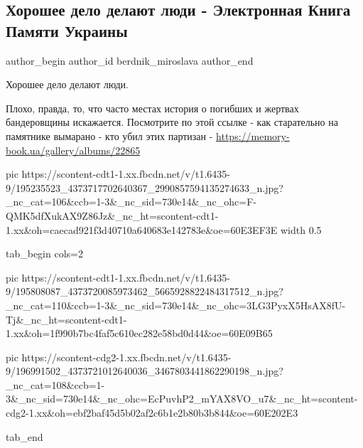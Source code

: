  
 
 
 
 
 
\subsection{Хорошее дело делают люди - Электронная Книга Памяти Украины}
\label{sec:06_06_2021.fb.berdnik_miroslava.3.kniga_pamjati_ukrainy}
\ifcmt
 author_begin
   author_id berdnik_miroslava
 author_end
\fi

Хорошее дело делают люди.

Плохо, правда, то, что часто местах история о погибших и жертвах бандеровщины
искажается.  Посмотрите по этой ссылке - как старательно на памятнике вымарано
- кто убил этих партизан - \url{https://memory-book.ua/gallery/albums/22865}

\ifcmt
  pic https://scontent-cdt1-1.xx.fbcdn.net/v/t1.6435-9/195235523_4373717702640367_2990857594135274633_n.jpg?_nc_cat=106&ccb=1-3&_nc_sid=730e14&_nc_ohc=F-QMK5dfXukAX9Z86Jz&_nc_ht=scontent-cdt1-1.xx&oh=caecad921f3d40710a640683e142783e&oe=60E3EF3E
	width 0.5

\fi

\ifcmt
  tab_begin cols=2

     pic https://scontent-cdt1-1.xx.fbcdn.net/v/t1.6435-9/195808087_4373720085973462_5665928822484317512_n.jpg?_nc_cat=110&ccb=1-3&_nc_sid=730e14&_nc_ohc=3LG3PyxX5HsAX8fU-Tj&_nc_ht=scontent-cdt1-1.xx&oh=1f990b7bc4faf5c610ec282e58bd0d44&oe=60E09B65

     pic https://scontent-cdg2-1.xx.fbcdn.net/v/t1.6435-9/196991502_4373721012640036_3467803441862290198_n.jpg?_nc_cat=108&ccb=1-3&_nc_sid=730e14&_nc_ohc=EcPuvhP2_mYAX8VO_u7&_nc_ht=scontent-cdg2-1.xx&oh=ebf2baf45d5b02af2c6b1e2b80b3b844&oe=60E202E3

  tab_end
\fi

